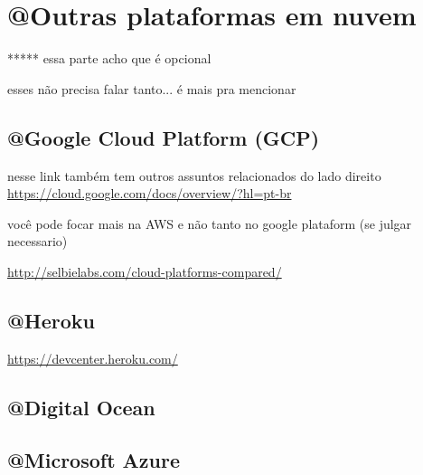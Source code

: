 \chapter{@Outras plataformas em nuvem}

***** essa parte acho que é opcional

esses não precisa falar tanto... é mais pra mencionar

\section{@Google Cloud Platform (GCP)}

nesse link também tem outros assuntos relacionados do lado direito
\url{https://cloud.google.com/docs/overview/?hl=pt-br}

você pode focar mais na AWS e não tanto no google plataform (se julgar necessario)


\url{http://selbielabs.com/cloud-platforms-compared/}

\section{@Heroku}

\url{https://devcenter.heroku.com/}

\section{@Digital Ocean}

\section{@Microsoft Azure}
